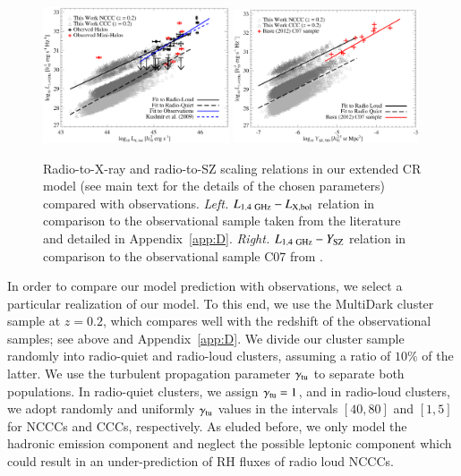 \documentclass[useAMS,usenatbib]{mn2e}
\begin{document}
\begin{figure} 
\centering
\includegraphics[width=0.49\textwidth]{figures/PL_relation.eps}
\includegraphics[width=0.49\textwidth]{figures/PSZ_relation.eps}
\caption{Radio-to-X-ray and radio-to-SZ scaling relations in our extended CR model
  (see main text for the details of the chosen parameters) compared with
  observations.  \emph{Left.} $L_{1.4~{\mathrm{GHz}}}-L_{{\mathrm{X,bol}}}$ relation in
  comparison to the observational sample taken from the literature and detailed
  in Appendix~\ref{app:D}. \emph{Right.} $L_{1.4~{\mathrm{GHz}}}-Y_{{\mathrm{SZ}}}$
  relation in comparison to the observational sample C07 from
  \protect\cite{2012MNRAS.421L.112B}.}
\label{fig:PLSZ}
\end{figure} 

In order to compare our model prediction with observations, we select a
particular realization of our model. To this end, we use the MultiDark cluster
sample at $z=0.2$, which compares well with the redshift of the observational
samples; see above and Appendix~\ref{app:D}. We divide our cluster sample
randomly into radio-quiet and radio-loud clusters, assuming a ratio of $10\%$ of
the latter. We use the turbulent propagation parameter $\gamma_{{\mathrm{tu}}}$ to
separate both populations. In radio-quiet clusters, we assign
$\gamma_{{\mathrm{tu}}}=1$, and in radio-loud clusters, we adopt randomly and
uniformly $\gamma_{{\mathrm{tu}}}$ values in the intervals $[40,80]$ and $[1,5]$ for
NCCCs and CCCs, respectively. As eluded before, we only model the hadronic
emission component and neglect the possible leptonic component which could
result in an under-prediction of RH fluxes of radio loud NCCCs.
\end{document}
